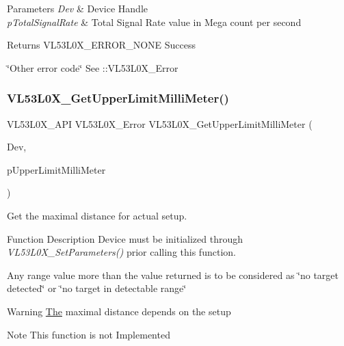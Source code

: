 \begin{DoxyParams}{Parameters}
{\em Dev} & Device Handle \\
\hline
{\em p\+Total\+Signal\+Rate} & Total Signal Rate value in Mega count per second \\
\hline
\end{DoxyParams}
\begin{DoxyReturn}{Returns}
V\+L53\+L0\+X\+\_\+\+E\+R\+R\+O\+R\+\_\+\+N\+O\+NE Success 

\char`\"{}\+Other error code\char`\"{} See \+::\+V\+L53\+L0\+X\+\_\+\+Error 
\end{DoxyReturn}
\mbox{\label{group__VL53L0X__general__group_gafa2d49e10b749cd6e57e50823184fea7}} 
\subsubsection{\texorpdfstring{V\+L53\+L0\+X\+\_\+\+Get\+Upper\+Limit\+Milli\+Meter()}{VL53L0X\_GetUpperLimitMilliMeter()}}
{\footnotesize\ttfamily V\+L53\+L0\+X\+\_\+\+A\+PI V\+L53\+L0\+X\+\_\+\+Error V\+L53\+L0\+X\+\_\+\+Get\+Upper\+Limit\+Milli\+Meter (\begin{DoxyParamCaption}\item[{\hyperlink{group__VL53L0X__platform__group_ga2d6405308b1dd524b462f1b8fb97d167}{V\+L53\+L0\+X\+\_\+\+D\+EV}}]{Dev,  }\item[{\hyperlink{vl53l0x__types_8h_a273cf69d639a59973b6019625df33e30}{uint16\+\_\+t} $\ast$}]{p\+Upper\+Limit\+Milli\+Meter }\end{DoxyParamCaption})}



Get the maximal distance for actual setup. 

\begin{DoxyParagraph}{Function Description}
Device must be initialized through {\itshape V\+L53\+L0\+X\+\_\+\+Set\+Parameters()} prior calling this function.
\end{DoxyParagraph}
Any range value more than the value returned is to be considered as \char`\"{}no target detected\char`\"{} or \char`\"{}no target in detectable range\char`\"{}~\newline
\begin{DoxyWarning}{Warning}
\hyperlink{structThe}{The} maximal distance depends on the setup
\end{DoxyWarning}
\begin{DoxyNote}{Note}
This function is not Implemented
\end{DoxyNote}

